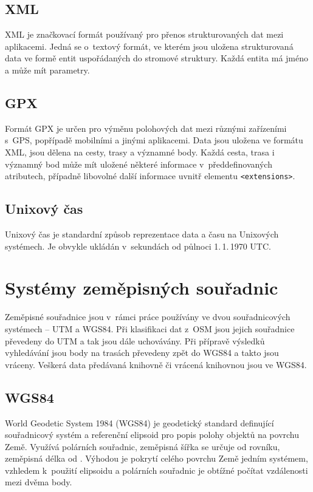 \subsection{XML}
XML \cite{XML} je značkovací formát používaný pro přenos strukturovaných dat
mezi aplikacemi. Jedná se o~textový formát, ve kterém jsou uložena strukturovaná
data ve formě entit uspořádaných do stromové struktury. Každá entita má jméno a
může mít parametry. 

\subsection{GPX}
Formát GPX\cite{GPX} je určen pro výměnu polohových dat mezi různými zařízeními s~GPS,
popřípadě mobilními a jinými aplikacemi. Data jsou uložena ve formátu XML, jsou
dělena na cesty, trasy a významné body. Každá cesta, trasa i významný bod může
mít uložené některé informace v~předdefinovaných atributech, případně libovolné
další informace uvnitř elementu {\tt <extensions>}. 

\subsection{Unixový čas}
Unixový čas je standardní způsob reprezentace data a času na Unixových
systémech. Je obvykle ukládán v~sekundách od půlnoci 1.\,1.\,1970 UTC.

\section{Systémy zeměpisných souřadnic}
Zeměpisné souřadnice jsou v~rámci práce používány ve dvou souřadnicových
systémech -- UTM a WGS84. Při klasifikaci dat z~OSM jsou jejich souřadnice
převedeny do UTM a tak jsou dále uchovávány. Při přípravě výsledků vyhledávání
jsou body na trasách převedeny zpět do WGS84 a takto jsou vráceny. Veškerá data
předávaná knihovně či vrácená knihovnou jsou ve WGS84.
\subsection{WGS84}
World Geodetic System 1984 (WGS84) \cite{WGS84} je geodetický standard
definující souřadnicový systém a referenční elipsoid pro popis polohy objektů na
povrchu Země. Využívá polárních souřadnic, zeměpisná šířka se určuje od rovníku,
zeměpisná délka od . Výhodou je pokrytí celého
povrchu Země jedním systémem, vzhledem k~použití elipsoidu a polárních souřadnic
je obtížné počítat vzdálenosti mezi dvěma body.

